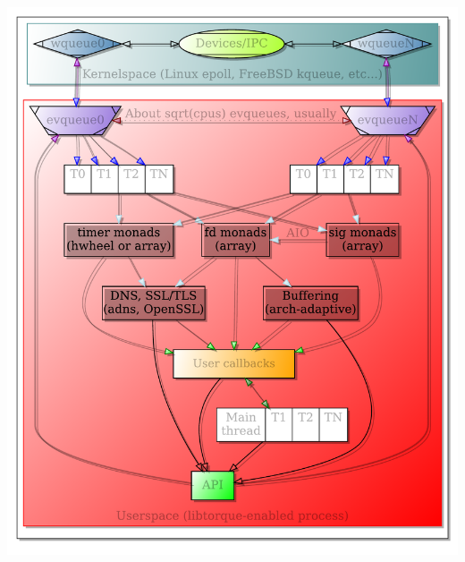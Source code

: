 \documentclass[letterpaper,10pt]{article}
\makeatletter
\newenvironment{figurehere}
{\def\@captype{figure}}
{}
\makeatother
\begin{document}
\begin{multicols}{2}
\setlength{\abovecaptionskip}{0pt}
\setlength{\belowcaptionskip}{0pt}
\begin{figurehere}
\centering
\includegraphics[width=\columnwidth]{libtorque}

\end{figurehere}
\end{multicols}
\end{document}
